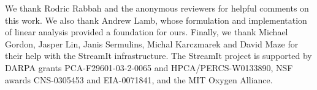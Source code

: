
We thank Rodric Rabbah and the anonymous reviewers for helpful
comments on this work.  We also thank Andrew Lamb, whose formulation
and implementation of linear analysis provided a foundation for ours.
Finally, we thank Michael Gordon, Jasper Lin, Janis Sermulins, Michal
Karczmarek and David Maze for their help with the StreamIt
infrastructure.  The StreamIt project is supported by DARPA grants
PCA-F29601-03-2-0065 and HPCA/PERCS-W0133890, NSF awards CNS-0305453
and EIA-0071841, and the MIT Oxygen Alliance.
